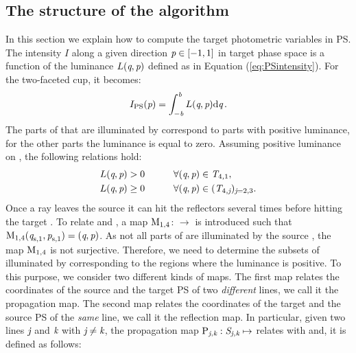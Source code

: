 \subsection{The structure of the algorithm}
In this section we explain how to compute the target photometric variables in PS.
The intensity $I$ along a given direction $\textit{p}\in [-1,1]$ in target phase space  is a function of the luminance $L(\textit{q}, \textit{p})$ defined as in Equation (\ref{eq:PSintensity}). For the two-faceted cup, it becomes:
\begin{equation}\label{I(eta)}
I_{\textrm{PS}}(\textit{p}) = \int_{-\textit{b}}^{\textit{b}} L(\textit{q},\textit{p}) \textrm{d}\textit{q}\,.
\end{equation}
The parts of  that are illuminated by  correspond to parts with positive luminance, for the other parts the luminance is equal to zero.
Assuming positive luminance on , the following relations hold:
\begin{equation}\label{LT4}
\begin{aligned}
L(\textit{q}, \textit{p})&>0 \qquad \quad \forall (\textit{q}, \textit{p})\in \mbox{$\emph{T}_{\textit{$4$,$1$}}$},\\
L(\textit{q}, \textit{p})&\geq 0 \qquad\quad \forall(\textit{q}, \textit{p}) \in (\mbox{$\emph{T}_{\textit{$4$,\textit{j}}}$})_{\textit{j}=2,3}.
\end{aligned}
\end{equation}
Once a ray leaves the source  it can hit the reflectors several times before hitting the target . To relate  and , a map $\mathrm{M}_{1,4}$: $\rightarrow$  is introduced such that $\mathrm{M}_{1,4}(\textit{q}_{\textrm{s,} \textit{$1$}},\textit{p}_{\textrm{s,} \textit{$1$}})=(\textit{q},\textit{p})$. As  not all parts of  are illuminated by the source , the map
$\mathrm{M}_{1,4}$ is not surjective.
Therefore, we need to determine the subsets of  illuminated by  corresponding to the regions where the luminance is positive.
To this purpose, we consider two different kinds of maps.
The first map relates the coordinates of the source and the target PS of two \textit{different} lines, we call it the propagation map.
The second map relates the coordinates of the target and the source PS of the \textit{same} line, we call it the reflection map.
In particular, given two lines $\textit{j}$ and $\textit{k}$ with $\textit{j}\neq\textit{k}$, the propagation map $\mathrm{P}_{\textit{j},\textit{k}}: \mbox{$\emph{S}_{\textit{\textit{j},\textit{k}}}$}\mapsto$ relates  with  and, it is defined as follows:
